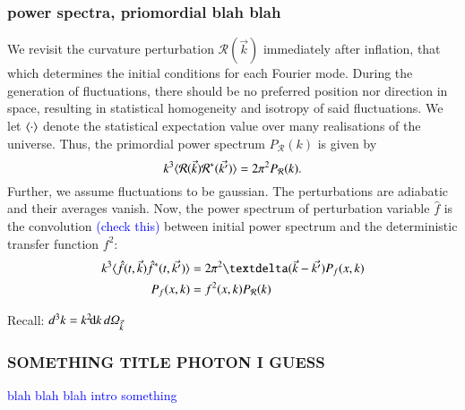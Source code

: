 \subsubsection{power spectra, priomordial blah blah}
    We revisit the curvature perturbation $\mathcal{R}(\vec{k})$ immediately after inflation, that which determines the initial conditions for each Fourier mode. During the generation of fluctuations, there should be no preferred position nor direction in space, resulting in statistical homogeneity and isotropy of said fluctuations. We let $\avg{\cdot}$ denote the statistical expectation value over many realisations of the universe. Thus, the primordial power spectrum $P_\mathcal{R}(k)$ is given by
    \begin{equation}
        k^3 \avg{\mathcal{R}(\vec{k})\mathcal{R}^*(\vec{k'})} = 2\pi^2P_\mathcal{R}(k).
    \end{equation}
    Further, we assume fluctuations to be gaussian. The perturbations are adiabatic and their averages vanish. Now, the power spectrum of perturbation variable $\hat{f}$ is the convolution \textcolor{blue}{(check this)} between initial power spectrum and the deterministic transfer function $f^2$:
    \begin{equation}
    \begin{split}
        k^3\avg{ \hat{f}(t,\vec{k}) \hat{f}^\ast (t,\vec{k'})} &= 2\pi^2 \deltafunc{\vec{k}-\vec{k'}} P_f (x,k) \\
        P_f(x,k) &= f^2(x,k) P_\mathcal{R}(k)
    \end{split}
    \end{equation}



    Recall: $d^3k = k^2 \dx{k} \dOmg[k]$


\subsubsection{SOMETHING TITLE PHOTON I GUESS}
\textcolor{blue}{blah blah blah intro something}


